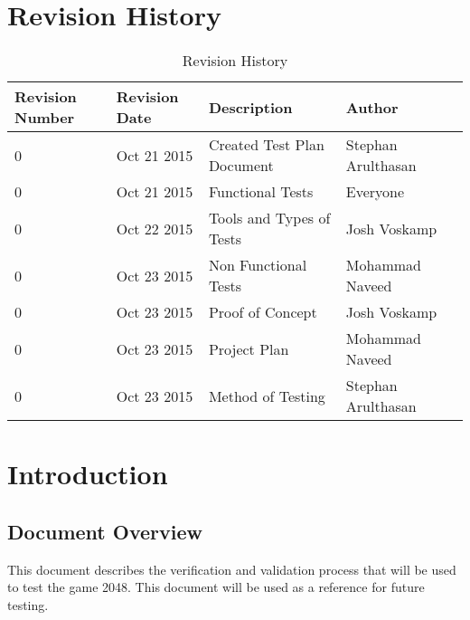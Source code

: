 \documentclass[12pt]{article}
\begin{document}
\begin{titlepage}

 

\vfill %

\end{titlepage}

\newpage
\tableofcontents
\newpage
\listoftables
\newpage

\section{Revision History}
\begin{table}[!htbp]
	\centering
    \begin{tabular}{ | p{2cm} | l| l | l |p{3cm}|}
    \hline
    Revision Number & Revision Date & Description & Author \\ \hline
    0 & Oct 21 2015 & Created Test Plan Document & Stephan Arulthasan \\ \hline
    0 & Oct 21 2015 & Functional Tests & Everyone \\ \hline
    0 & Oct 22 2015 & Tools and Types of Tests & Josh Voskamp \\ \hline
    0 & Oct 23 2015 & Non Functional Tests & Mohammad Naveed \\ \hline
    0 & Oct 23 2015 & Proof of Concept & Josh Voskamp \\ \hline
    0 & Oct 23 2015 & Project Plan & Mohammad Naveed \\ \hline
    0 & Oct 23 2015 & Method of Testing & Stephan Arulthasan \\ \hline
    
    \end{tabular}
    \caption{Revision History}
\end{table}


\newpage

\section{Introduction}

\subsection{Document Overview}
This document describes the verification and validation process that will be 
used to test the game 2048. This document will be used as a reference for 
future testing.
\end{document}
